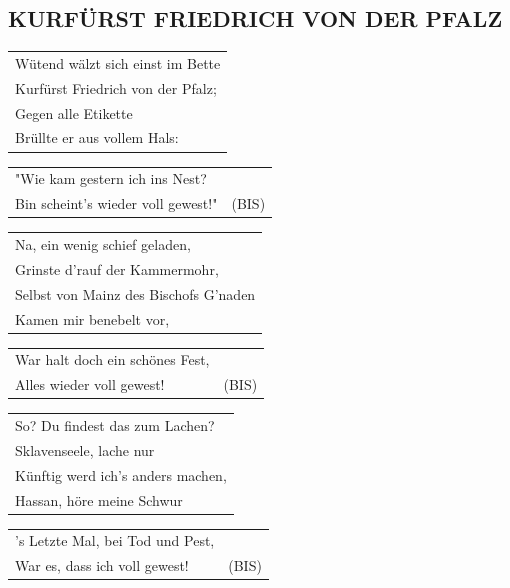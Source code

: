 \documentclass{article}
\begin{document}
\subsection*{KURFÜRST FRIEDRICH VON DER PFALZ}
\begin{flushleft}
\begin{tabularx}{\textwidth} {
    >{\raggedright\arraybackslash}X}
Wütend wälzt sich einst im Bette\\
Kurfürst Friedrich von der Pfalz;\\
Gegen alle Etikette\\
Brüllte er aus vollem Hals:\\
\end{tabularx}
\begin{tabularx}{\textwidth} {
    >{\raggedright\arraybackslash}X |c}
"Wie kam gestern ich ins Nest? & \\
Bin scheint’s wieder voll gewest!" & (BIS) \\
\end{tabularx}
\end{flushleft}
\begin{flushleft}
\begin{tabularx}{\textwidth} {
    >{\raggedright\arraybackslash}X}
Na, ein wenig schief geladen,\\
Grinste d’rauf der Kammermohr,\\
Selbst von Mainz des Bischofs G’naden\\
Kamen mir benebelt vor,\\
\end{tabularx}
\begin{tabularx}{\textwidth} {
    >{\raggedright\arraybackslash}X |c}
War halt doch ein schönes Fest, & \\
Alles wieder voll gewest! & (BIS) \\
\end{tabularx}
\end{flushleft}
\begin{flushleft}
\begin{tabularx}{\textwidth} {
    >{\raggedright\arraybackslash}X}
So? Du findest das zum Lachen?\\
Sklavenseele, lache nur\\
Künftig werd ich’s anders machen,\\
Hassan, höre meine Schwur\\
\end{tabularx}
\begin{tabularx}{\textwidth} {
    >{\raggedright\arraybackslash}X |c}
’s Letzte Mal, bei Tod und Pest, & \\
War es, dass ich voll gewest! & (BIS) \\
\end{tabularx}
\end{flushleft}
\end{document}
